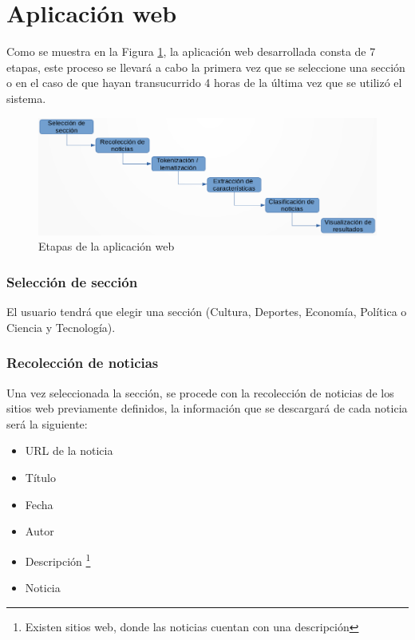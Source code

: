 \section{Aplicación web}

Como se muestra en la Figura \ref{fig:procesoAppWeb}, la aplicación web desarrollada consta de 7 etapas, este proceso se llevará a cabo la primera vez que se seleccione una sección o en el caso de que hayan transucurrido 4 horas de la última vez que se utilizó el sistema.
\\

\begin{figure}[H]
	\centering
	\includegraphics[scale=0.3]{imagenes/Capitulo5/procesoRecoleccionClasificacion.png}
	\caption{Etapas de la aplicación web}
	\label{fig:procesoAppWeb}
\end{figure}

\subsubsection{Selección de sección}
El usuario tendrá que elegir una sección (Cultura, Deportes, Economía, Política o Ciencia y Tecnología). 
\\

\subsubsection{Recolección de noticias}
Una vez seleccionada la sección, se procede con la recolección de noticias de los sitios web previamente definidos, la información que se descargará de cada noticia será la siguiente:

\begin{itemize}
	\item URL de la noticia
	\item Título
	\item Fecha
	\item Autor
	\item Descripción \footnote{Existen sitios web, donde las noticias cuentan con una descripción}
	\item Noticia
\end{itemize}

